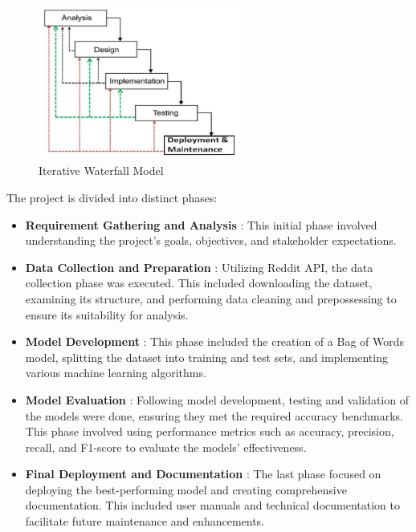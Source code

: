 \vspace{1em}

\begin{figure}[h!]  
    \centering
    \includegraphics[width=0.6\textwidth]{Images/01 Life_cycle.jpg}  
    \caption{Iterative Waterfall Model}
    \label{Iterative Waterfall Model}  %
\end{figure}

\noindent
The project is divided into distinct phases:

\begin{itemize}
    \item \textbf{Requirement Gathering and Analysis} :
    \noindent
    This initial phase involved understanding the project's goals, objectives, and stakeholder expectations.
    \item \textbf{Data Collection and Preparation} :
    \noindent
    Utilizing Reddit API, the data collection phase was executed. This included downloading the dataset, examining its structure, and performing data cleaning and prepossessing to ensure its suitability for analysis.
    \item \textbf{Model Development} :
    \noindent
    This phase included the creation of a Bag of Words model, splitting the dataset into training and test sets, and implementing various machine learning algorithms.
    \item \textbf{Model Evaluation} :
    \noindent
    Following model development, testing and validation of the models were done, ensuring they met the required accuracy benchmarks. This phase involved using performance metrics such as accuracy, precision, recall, and F1-score to evaluate the models' effectiveness.
    \item \textbf{Final Deployment and Documentation} :
    \noindent
    The last phase focused on deploying the best-performing model and creating comprehensive documentation. This included user manuals and technical documentation to facilitate future maintenance and enhancements.
\end{itemize}


